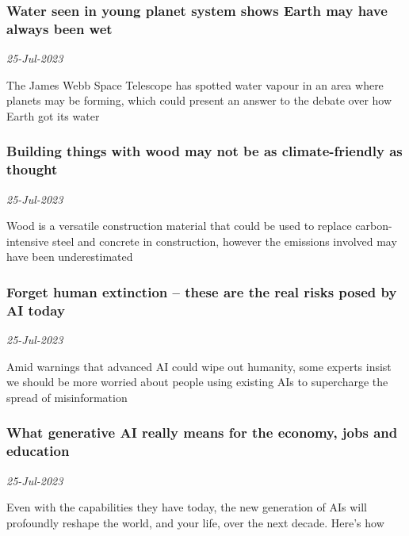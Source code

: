 \subsubsection{Water seen in young planet system shows Earth may have always been wet \href{https://www.newscientist.com/article/2384405-water-seen-in-young-planet-system-shows-earth-may-have-always-been-wet/?utm_campaign=RSS%7CNSNS&utm_source=NSNS&utm_medium=RSS&utm_content=home}{}}
\textit{25-Jul-2023}

The James Webb Space Telescope has spotted water vapour in an area where planets may be forming, which could present an answer to the debate over how Earth got its water
\subsubsection{Building things with wood may not be as climate-friendly as thought \href{https://www.newscientist.com/article/2384394-building-things-with-wood-may-not-be-as-climate-friendly-as-thought/?utm_campaign=RSS%7CNSNS&utm_source=NSNS&utm_medium=RSS&utm_content=home}{\ding{225}}}
\textit{25-Jul-2023}

Wood is a versatile construction material that could be used to replace carbon-intensive steel and concrete in construction, however the emissions involved may have been underestimated
\subsubsection{Forget human extinction – these are the real risks posed by AI today \href{https://www.newscientist.com/article/2384063-forget-human-extinction-these-are-the-real-risks-posed-by-ai-today/?utm_campaign=RSS%7CNSNS&utm_source=NSNS&utm_medium=RSS&utm_content=home}{}}
\textit{25-Jul-2023}

Amid warnings that advanced AI could wipe out humanity, some experts insist we should be more worried about people using existing AIs to supercharge the spread of misinformation
\subsubsection{What generative AI really means for the economy, jobs and education \href{https://www.newscientist.com/article/2384034-what-generative-ai-really-means-for-the-economy-jobs-and-education/?utm_campaign=RSS%7CNSNS&utm_source=NSNS&utm_medium=RSS&utm_content=home}{\ding{225}}}
\textit{25-Jul-2023}

Even with the capabilities they have today, the new generation of AIs will profoundly reshape the world, and your life, over the next decade. Here’s how
